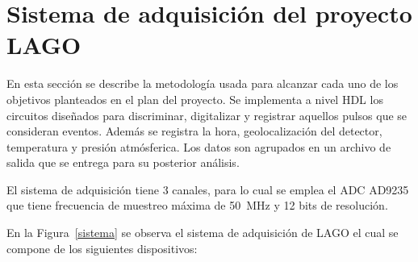 \chapter{Sistema de adquisición del proyecto LAGO}
En esta sección se describe la metodología usada para alcanzar cada uno de los objetivos planteados en el plan del proyecto.
Se implementa a nivel HDL los circuitos diseñados para discriminar, digitalizar y registrar aquellos pulsos que se consideran eventos.
Además se registra la hora, geolocalización del detector, temperatura y presión atmósferica. Los datos son agrupados en un archivo de salida que se entrega para su posterior análisis.

El sistema de adquisición tiene 3 canales, para lo cual se emplea el ADC AD9235 que tiene frecuencia de muestreo máxima de 50~MHz y 12 bits de resolución.

En la Figura~\ref{sistema} se observa el sistema de adquisición de LAGO el cual se compone de los siguientes dispositivos: 

